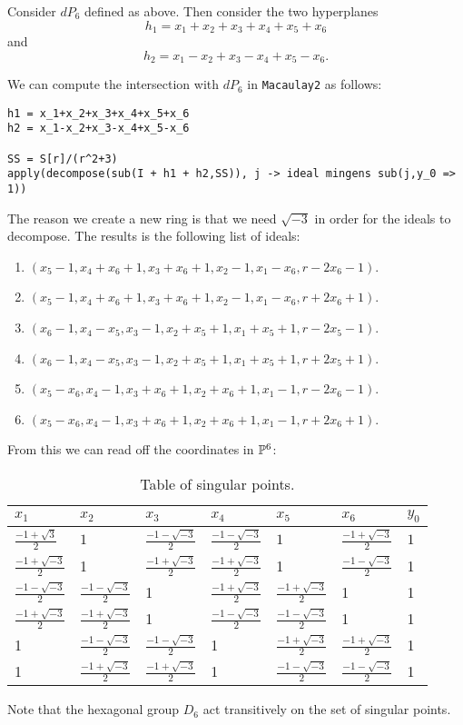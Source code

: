\documentclass[11pt, english]{article}
\begin{document}
Consider $dP_6$ defined as above. Then consider the two hyperplanes
$$
h_1 = x_1+x_2+x_3+x_4+x_5+x_6
$$
and
$$
h_2 = x_1-x_2+x_3-x_4+x_5-x_6.
$$

We can compute the intersection with $dP_6$ in \texttt{Macaulay2} as follows:
\begin{lstlisting}
h1 = x_1+x_2+x_3+x_4+x_5+x_6
h2 = x_1-x_2+x_3-x_4+x_5-x_6

SS = S[r]/(r^2+3)
apply(decompose(sub(I + h1 + h2,SS)), j -> ideal mingens sub(j,y_0 => 1))
\end{lstlisting}

The reason we create a new ring is that we need $\sqrt{-3}$ in order for the ideals to decompose. The results is the following list of ideals:

\begin{enumerate}
	\item $(x_5-1,x_4+x_6+1,x_3+x_6+1,x_2-1,x_1-x_6,r-2x_6-1)$.
	\item $(x_5-1,x_4+x_6+1,x_3+x_6+1,x_2-1,x_1-x_6,r+2x_6+1)$.
	\item $(x_6-1,x_4-x_5,x_3-1,x_2+x_5+1,x_1+x_5+1,r-2x_5-1)$.
	\item $(x_6-1,x_4-x_5,x_3-1,x_2+x_5+1,x_1+x_5+1,r+2x_5+1)$.
	\item $(x_5-x_6,x_4-1,x_3+x_6+1,x_2+x_6+1,x_1-1,r-2x_6-1)$.
	\item $(x_5-x_6,x_4-1,x_3+x_6+1,x_2+x_6+1,x_1-1,r+2x_6+1)$.
\end{enumerate}


From this we can read off the coordinates in $\mathbb{P}^6$:

\begin{table}[h]
\centering
\caption{Table of singular points.}
\label{singpoints}
\begin{tabular}{@{}lllllll@{}}
\toprule
$x_1$ & $x_2$ & $x_3$ & $x_4$ & $x_5$ & $x_6$ & $y_0$ \\ \midrule
$\frac{-1+\sqrt{3}}{2}$ & $1$ & $\frac{-1-\sqrt{-3}}{2}$ & $\frac{-1-\sqrt{-3}}{2}$ & $1$& $\frac{-1 + \sqrt{-3}}{2}$  & $1$ \\
 $\frac{-1+\sqrt{-3}}{2}$& 1 & $\frac{-1+\sqrt{-3}}{2}$ & $\frac{-1+\sqrt{-3}}{2}$ & 1& $\frac{-1-\sqrt{-3}}{2}$ & 1 \\
 $\frac{-1-\sqrt{-3}}{2}$ & $\frac{-1-\sqrt{-3}}{2}$ & 1  & $\frac{-1+\sqrt{-3}}{2}$  & $\frac{-1+\sqrt{-3}}{2}$ & 1& 1 \\
$ \frac{-1+\sqrt{-3}}{2}$ & $\frac{-1+\sqrt{-3}}{2}$ & 1  & $\frac{-1-\sqrt{-3}}{2}$ & $\frac{-1-\sqrt{-3}}{2}$ & 1& 1 \\
1& $\frac{-1-\sqrt{-3}}{2}$ & $\frac{-1-\sqrt{-3}}{2}$ & 1 & $\frac{-1+\sqrt{-3}}{2}$ & $\frac{-1+\sqrt{-3}}{2}$ & 1 \\
1& $\frac{-1+\sqrt{-3}}{2}$ & $\frac{-1+\sqrt{-3}}{2}$ & 1 & $\frac{-1-\sqrt{-3}}{2}$ & $\frac{-1-\sqrt{-3}}{2}$  & 1 \\ \bottomrule
\end{tabular}
\end{table}

Note that the hexagonal group $D_6$ act transitively on the set of singular points.
\end{document}
